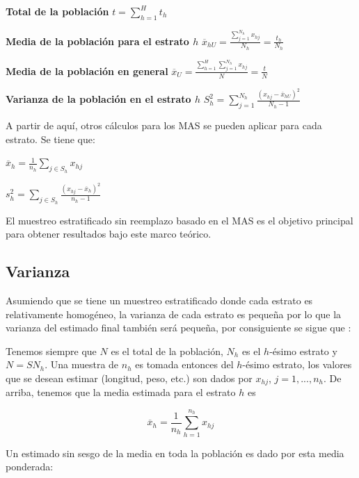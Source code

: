 \documentclass{report}
\begin{document}
\bigbreak

\textbf{Total de la población}
\bigbreak
$t = \sum_{h=1}^H t_h$


\bigbreak

\textbf{Media de la población para el estrato $h$}
\bigbreak
$\overline{x}_{hU} = \frac{\sum_{j=1}^{N_h} x_{hj}}{N_h} = \frac{t_h}{N_h}$


\bigbreak

\textbf{Media de la población en general}
\bigbreak
$\overline{x}_U = \frac{\sum_{h=1}^H \sum_{j=1}^{N_h} x_{hj}}{N} = \frac{t}{N}$


\bigbreak

\textbf{Varianza de la población en el estrato $h$}
\bigbreak
$S_h^2 = \sum_{j=1}^{N_h} \frac{(x_{hj} - \overline{x}_{hU})^2}{N_h - 1}$


\bigbreak

A partir de aquí, otros cálculos para los MAS se pueden aplicar para cada estrato. Se tiene que:

\bigbreak

$\overline{x}_h = \frac{1}{n_h} \sum_{j \in S_h} x_{hj}$

\bigbreak

$s^2_h = \sum_{j \in S_h} \frac{(x_{hj} - \overline{x}_h)^2}{n_h - 1}$

\bigbreak

El muestreo estratificado sin reemplazo basado en el MAS es el objetivo principal para obtener resultados bajo este marco teórico.

\subsection{Varianza}

Asumiendo que se tiene un muestreo estratificado donde cada estrato es relativamente homogéneo, la varianza de cada estrato es pequeña por lo que la varianza del estimado final también será pequeña, por consiguiente se sigue que \cite{gulland-1966}:

\bigbreak

Tenemos siempre que $N$ es el total de la población, $N_h$ es el $h$-ésimo estrato y $N=SN_h$. Una muestra de $n_h$ es tomada entonces del $h$-ésimo estrato, los valores que se desean estimar (longitud, peso, etc.) son dados por $x_{hj}$, $j=1,...,n_h$. De arriba, tenemos que la media estimada para el estrato $h$ es

$$
\overline{x}_h = \frac{1}{n_h} \sum_{h=1}^{n_h} x_{hj}
$$

Un estimado sin sesgo de la media en toda la población es dado por esta media ponderada:
\end{document}
